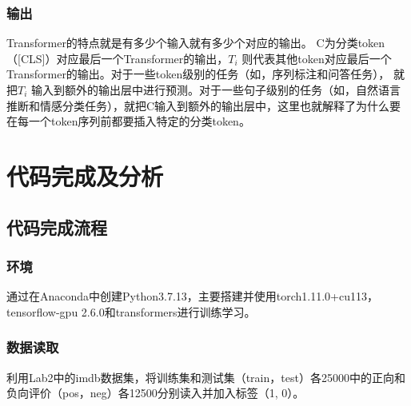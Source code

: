 \documentclass[a4paper,AutoFakeBold,AutoFakeSlant]{ctexart}
\begin{document}
\subsubsection{输出}
Transformer的特点就是有多少个输入就有多少个对应的输出。
C为分类token（[CLS]）对应最后一个Transformer的输出，$T_i$ 则代表其他token对应最后一个Transformer的输出。对于一些token级别的任务（如，序列标注和问答任务），
就把$T_i$ 输入到额外的输出层中进行预测。对于一些句子级别的任务（如，自然语言推断和情感分类任务），就把C输入到额外的输出层中，这里也就解释了为什么要在每一个token序列前都要插入特定的分类token。


\section{代码完成及分析}

\subsection{代码完成流程}
\subsubsection{环境}
通过在Anaconda中创建Python3.7.13，主要搭建并使用torch1.11.0+cu113，tensorflow-gpu 2.6.0和transformers进行训练学习。

\subsubsection{数据读取}
利用Lab2中的imdb数据集，将训练集和测试集（train，test）各25000中的正向和负向评价（pos，neg）各12500分别读入并加入标签（1, 0）。
\end{document}
